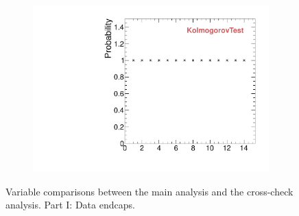 \begin{figure}
\begin{subfigure}[b]{0.2\textwidth}
                \includegraphics[width=\textwidth]{Figures/VariablesComparison/Data_endcaps_figs/KS}
                \label{fig:Data_endcaps_KS}
        \end{subfigure}
        \caption{Variable comparisons between the main analysis and the cross-check analysis. Part I: Data endcaps.}
        \label{fig:Data_endcaps_figs}
\end{figure}


